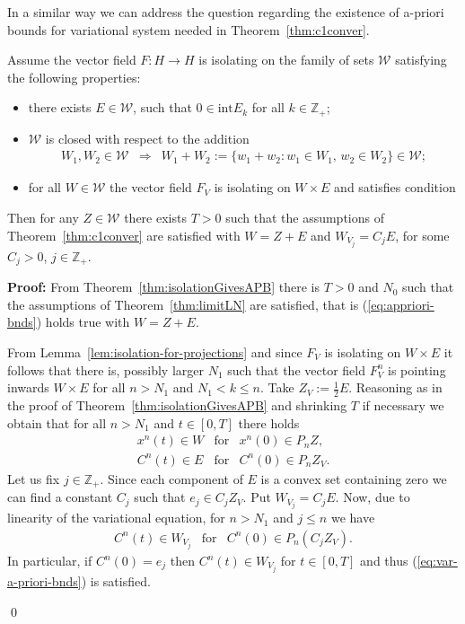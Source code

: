 In a similar way we can address the question regarding the existence of a-priori bounds for variational system needed  in Theorem~\ref{thm:c1conver}.
\begin{theorem}
	Assume the vector field $F:H\to H$ is isolating on the family of sets $\mathcal W$ satisfying the following properties:
	\begin{itemize}
		\item there exists $E\in \mathcal W$, such that $0\in\mathrm{int}E_k$ for all $k\in\mathbb Z_+$;
		\item $\mathcal W$ is closed with respect to the addition
		\begin{eqnarray*}
			W_1,W_2\in \mathcal W &\Longrightarrow&  W_1+W_2:=\{w_1+w_2: w_1\in W_1,\, w_2\in W_2 \}\in\mathcal W;
		\end{eqnarray*}
		\item for all $W\in\mathcal W$ the vector field $F_V$ is isolating on $W\times E$ and satisfies condition \VL
	\end{itemize}		
	Then for any $Z\in\mathcal W$ there exists $T>0$ such that the assumptions of Theorem~\ref{thm:c1conver} are satisfied with $W=Z+E$ and $W_{V_j}=C_jE$, for some $C_j>0$, $j\in\mathbb Z_+$.
\end{theorem}

\textbf{Proof:}
From Theorem~\ref{thm:isolationGivesAPB} there is $T>0$ and $N_0$ such that the assumptions of Theorem~\ref{thm:limitLN} are satisfied, that is (\ref{eq:appriori-bnds}) holds true with $W=Z+E$.

From Lemma~\ref{lem:isolation-for-projections} and since $F_V$ is isolating on $W\times E$ it follows that there is, possibly larger $N_1$ such that the vector field $F_V^n$ is pointing inwards $W\times E$ for all $n>N_1$ and $N_1<k\leq n$. Take $Z_V:=\frac{1}{2}E$. Reasoning as in the proof of Theorem~\ref{thm:isolationGivesAPB} and shrinking $T$ if necessary we obtain that for all $n>N_1$ and $t\in[0,T]$ there holds
\begin{eqnarray*}
	x^n(t)\in W&\text{for}& x^n(0)\in P_nZ,\\
	C^n(t)\in E&\text{for}& C^n(0)\in P_nZ_V.
\end{eqnarray*}
Let us fix $j\in \mathbb Z_+$. Since each component of $E$ is a convex set containing zero we can find a constant $C_j$ such that $e_j\in C_jZ_V$. Put $W_{V_j}=C_jE$. Now, due to linearity of the variational equation, for $n>N_1$ and $j\leq n$ we have
\begin{eqnarray*}
	C^n(t)\in W_{V_j}&\text{for}& C^n(0)\in P_n(C_jZ_V).
\end{eqnarray*}
In particular, if $C^n(0)=e_j$ then $C^n(t)\in W_{V_j}$ for $t\in[0,T]$ and thus (\ref{eq:var-a-priori-bnds}) is satisfied.

\qed 